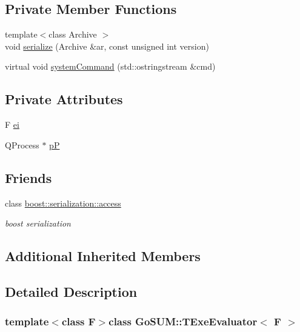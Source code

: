 \subsection*{Private Member Functions}
\begin{DoxyCompactItemize}
\item 
{\footnotesize template$<$class Archive $>$ }\\void \hyperlink{class_go_s_u_m_1_1_t_exe_evaluator_a176872b0078963c5a2514a93c425f72a}{serialize} (Archive \&ar, const unsigned int version)
\item 
virtual void \hyperlink{class_go_s_u_m_1_1_t_exe_evaluator_add51ecf6232d4cb0a8dd33a05472976b}{system\-Command} (std\-::ostringstream \&cmd)
\end{DoxyCompactItemize}
\subsection*{Private Attributes}
\begin{DoxyCompactItemize}
\item 
F \hyperlink{class_go_s_u_m_1_1_t_exe_evaluator_a64bc943e457b942367662298bca60211}{ei}
\item 
Q\-Process $\ast$ \hyperlink{class_go_s_u_m_1_1_t_exe_evaluator_a660bd62e713f8cdaf329e4dafad6b740}{p\-P}
\end{DoxyCompactItemize}
\subsection*{Friends}
\begin{DoxyCompactItemize}
\item 
class \hyperlink{class_go_s_u_m_1_1_t_exe_evaluator_ac98d07dd8f7b70e16ccb9a01abf56b9c}{boost\-::serialization\-::access}
\begin{DoxyCompactList}\small\item\em boost serialization \end{DoxyCompactList}\end{DoxyCompactItemize}
\subsection*{Additional Inherited Members}


\subsection{Detailed Description}
\subsubsection*{template$<$class F$>$class Go\-S\-U\-M\-::\-T\-Exe\-Evaluator$<$ F $>$}

